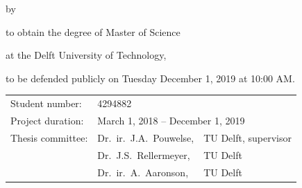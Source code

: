 \begin{titlepage}
	
	
	\begin{center}
		
		
		{\makeatletter
			\largetitlestyle\fontsize{64}{94}\selectfont\@title
			\makeatother}
		
		{\makeatletter
			\ifx\@subtitle\undefined\else
			\bigskip
			{\tudsffamily\fontsize{22}{32}\selectfont\@subtitle}    
			\fi
			\makeatother}
		
		\bigskip
		\bigskip
		
		by
		
		\bigskip
		\bigskip
		
		{\makeatletter
			\largetitlestyle\fontsize{26}{26}\selectfont\@author
			\makeatother}
		
		\bigskip
		\bigskip
		
		to obtain the degree of Master of Science
		
		at the Delft University of Technology,
		
		to be defended publicly on Tuesday December 1, 2019 at 10:00 AM.
		
		\vfill
		
		\begin{tabular}{lll}
			Student number: & 4294882 \\
			Project duration: & \multicolumn{2}{l}{March 1, 2018 -- December 1, 2019} \\
			Thesis committee: & Dr.\ ir.\  J.A.\ Pouwelse, & TU Delft, supervisor \\
			& Dr.\ J.S.\ Rellermeyer, & TU Delft \\
			& Dr.\ ir.\ A.\ Aaronson, & TU Delft
		\end{tabular}
		
		\bigskip
		\bigskip
		

\end{center}
\end{titlepage}
